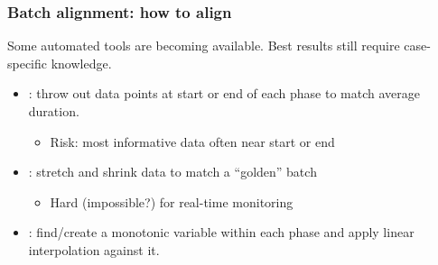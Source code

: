 \documentclass[handout, 12pt]{beamer}
\begin{document}
\begin{frame}\frametitle{Batch alignment: how to align}

Some automated tools are becoming available.  Best results still require case-specific knowledge.
\begin{itemize}
	
	\item	{}: throw out data points at start or end of each phase to match average duration.
	
			\begin{itemize}
				\item	\alert{Risk}:  most informative data often near start or end
			\end{itemize}
			
			\pause
	
	\item	{}: stretch and shrink data to match a ``golden'' batch
	
			\begin{itemize}
				\item	Hard (impossible?) for real-time monitoring
			\end{itemize}
			
			\pause
	
	\item	{}: find/create a monotonic variable within each phase and apply linear interpolation against it.
		
\end{itemize}

\end{frame}
\end{document}

